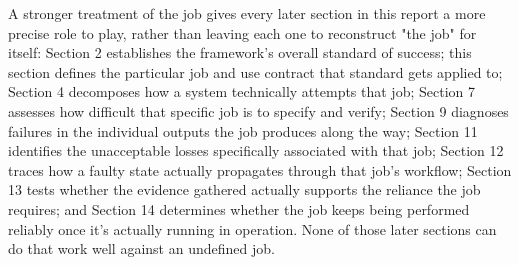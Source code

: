 A stronger treatment of the job gives every later section in this report a more precise role to play, rather than leaving each one to reconstruct "the job" for itself: Section 2 establishes the framework's overall standard of success; this section defines the particular job and use contract that standard gets applied to; Section 4 decomposes how a system technically attempts that job; Section 7 assesses how difficult that specific job is to specify and verify; Section 9 diagnoses failures in the individual outputs the job produces along the way; Section 11 identifies the unacceptable losses specifically associated with that job; Section 12 traces how a faulty state actually propagates through that job's workflow; Section 13 tests whether the evidence gathered actually supports the reliance the job requires; and Section 14 determines whether the job keeps being performed reliably once it's actually running in operation. None of those later sections can do that work well against an undefined job.
